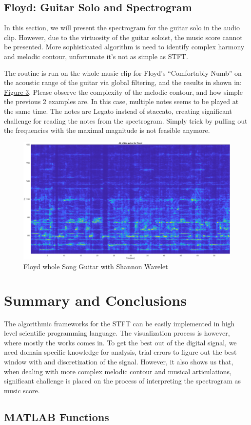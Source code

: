 \documentclass{article}
\begin{document}
    \subsection{Floyd: Guitar Solo and Spectrogram}
        \par\hspace{1.1em}
        In this section, we will present the spectrogram for the guitar solo in the audio clip. However, due to the virtuosity of the guitar soloist, the music score cannot be presented. More sophisticated algorithm is need to identify complex harmony and melodic contour, unfortunate it's not as simple as STFT. 
        \par
        The routine is run on the whole music clip for Floyd's ``Comfortably Numb'' on the acoustic range of the guitar via global filtering, and the results in shown in: \hyperref[fig:3]{Figure 3}. Please observe the complexity of the melodic contour, and how simple the previous 2 examples are. In this case, multiple notes seems to be played at the same time. The notes are Legato instead of staccato, creating significant challenge for reading the notes from the spectrogram. Simply trick by pulling out the frequencies with the maximal magnitude is not feasible anymore. 

        \begin{figure}[h]
        \centering
            \includegraphics*[width=0.7\linewidth]{floyd-all-guitar.png}    
            \caption{Floyd whole Song Guitar with Shannon Wavelet}
            \label{fig:3}
        \end{figure}

\section{Summary and Conclusions}
    \par\hspace{1.1em}
    The algorithmic frameworks for the STFT can be easily implemented in high level scientific programming language. The visualization process is however, where mostly the works comes in. To get the best out of the digital signal, we need domain specific knowledge for analysis, trial errors to figure out the best window with and discretization of the signal. However, it also shows us that, when dealing with more complex melodic contour and musical articulations, significant challenge is placed on the process of interpreting the spectrogram as music score.
\printbibliography
    
\begin{appendices}

\section{MATLAB Functions}
    
\end{appendices}
\end{document}
